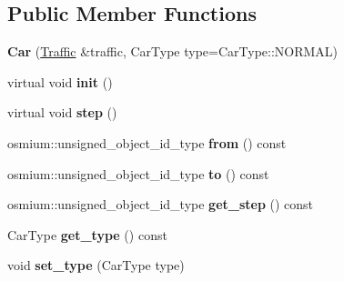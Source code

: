 \subsection*{Public Member Functions}
\begin{DoxyCompactItemize}
\item 
\hypertarget{classjustine_1_1robocar_1_1Car_ae3cb19dcf6cbee13fa22247dfbe857d7}{{\bfseries Car} (\hyperlink{classjustine_1_1robocar_1_1Traffic}{Traffic} \&traffic, Car\-Type type=Car\-Type\-::\-N\-O\-R\-M\-A\-L)}\label{classjustine_1_1robocar_1_1Car_ae3cb19dcf6cbee13fa22247dfbe857d7}

\item 
\hypertarget{classjustine_1_1robocar_1_1Car_a6448560523b0271b86be67e3e6505f4a}{virtual void {\bfseries init} ()}\label{classjustine_1_1robocar_1_1Car_a6448560523b0271b86be67e3e6505f4a}

\item 
\hypertarget{classjustine_1_1robocar_1_1Car_a8714ac61dc6eb8ad2baef998aa6e8758}{virtual void {\bfseries step} ()}\label{classjustine_1_1robocar_1_1Car_a8714ac61dc6eb8ad2baef998aa6e8758}

\item 
\hypertarget{classjustine_1_1robocar_1_1Car_a6f687cc942b9703896e4611dcd0de687}{osmium\-::unsigned\-\_\-object\-\_\-id\-\_\-type {\bfseries from} () const }\label{classjustine_1_1robocar_1_1Car_a6f687cc942b9703896e4611dcd0de687}

\item 
\hypertarget{classjustine_1_1robocar_1_1Car_a089017383dbbe588dd1235bee18b3be1}{osmium\-::unsigned\-\_\-object\-\_\-id\-\_\-type {\bfseries to} () const }\label{classjustine_1_1robocar_1_1Car_a089017383dbbe588dd1235bee18b3be1}

\item 
\hypertarget{classjustine_1_1robocar_1_1Car_ada98233230a5f4acc9dcabccc17f9d9c}{osmium\-::unsigned\-\_\-object\-\_\-id\-\_\-type {\bfseries get\-\_\-step} () const }\label{classjustine_1_1robocar_1_1Car_ada98233230a5f4acc9dcabccc17f9d9c}

\item 
\hypertarget{classjustine_1_1robocar_1_1Car_a6ea284ecb2413f121092f925ca9275fc}{Car\-Type {\bfseries get\-\_\-type} () const }\label{classjustine_1_1robocar_1_1Car_a6ea284ecb2413f121092f925ca9275fc}

\item 
\hypertarget{classjustine_1_1robocar_1_1Car_a00607bcb72a39b4188f80ecb384e0014}{void {\bfseries set\-\_\-type} (Car\-Type type)}\label{classjustine_1_1robocar_1_1Car_a00607bcb72a39b4188f80ecb384e0014}


\end{DoxyCompactItemize}

